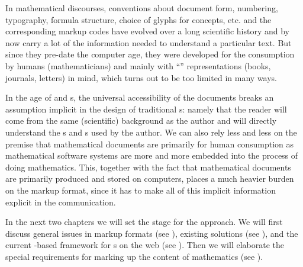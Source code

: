   In mathematical discourses, conventions about document form, numbering, typography,
  formula structure, choice of glyphs for concepts, etc. and the corresponding markup
  codes have evolved over a long scientific history and by now carry a lot of the
  information needed to understand a particular text. But since they pre-date the computer
  age, they were developed for the consumption by humans (mathematicians) and mainly with
  ``{}'' representations (books, journals, letters) in mind, which
  turns out to be too limited in many ways.

  In the age of {} and
  {s}, the universal accessibility of the
  documents breaks an assumption implicit in the design of traditional
  {s}: namely that the reader will come from the same
  (scientific) background as the author and will directly
  understand the {s} and {s} used by
  the author.  We can also rely less and less on the premise that mathematical documents
  are primarily for human consumption as mathematical software systems are more and more
  embedded into the process of doing mathematics. This, together with the fact that
  mathematical documents are primarily produced and stored on computers, places a much
  heavier burden on the markup format, since it has to make all of this implicit
  information explicit in the communication.

  In the next two chapters we will set the stage for the {\omdoc} approach. We will first
  discuss general issues in markup formats (see {}), existing
  solutions (see {}), and the current
  {\xml}-based framework for {s} on the web
  (see {}).  Then we will elaborate the special
  requirements for marking up the content of mathematics (see {}).




